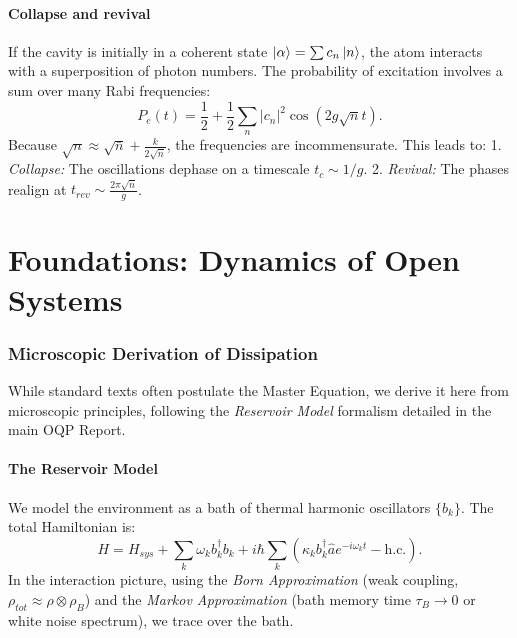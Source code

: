 \documentclass[11pt,a4paper]{article}
\newcommand{\hc}{\hat{a}}
\theoremstyle{definition}
\begin{document}
\subsection{Collapse and revival}
If the cavity is initially in a coherent state $\ket{\alpha} = \sum c_n \ket{n}$, the atom interacts with a superposition of photon numbers.
The probability of excitation involves a sum over many Rabi frequencies:
\begin{equation}
    P_e(t) = \frac{1}{2} + \frac{1}{2} \sum_n |c_n|^2 \cos(2g\sqrt{n}t).
\end{equation}
Because $\sqrt{n} \approx \sqrt{\bar{n}} + \frac{k}{2\sqrt{\bar{n}}}$, the frequencies are incommensurate. This leads to:
1.  \emph{Collapse:} The oscillations dephase on a timescale $t_c \sim 1/g$.
2.  \emph{Revival:} The phases realign at $t_{rev} \sim \frac{2\pi\sqrt{\bar{n}}}{g}$.

\part{Foundations: Dynamics of Open Systems}

\section{Microscopic Derivation of Dissipation}
\label{sec:open_systems}

While standard texts often postulate the Master Equation, we derive it here from microscopic principles, following the \emph{Reservoir Model} formalism detailed in the main OQP Report.

\subsection{The Reservoir Model}
We model the environment as a bath of thermal harmonic oscillators $\{b_k\}$. The total Hamiltonian is:
\begin{equation}
    H = H_{sys} + \sum_k \omega_k b_k^\dagger b_k + i\hbar \sum_k (\kappa_k b_k^\dagger \hc e^{-i\omega_k t} - \text{h.c.}).
\end{equation}
In the interaction picture, using the \emph{Born Approximation} (weak coupling, $\rho_{tot} \approx \rho \otimes \rho_B$) and the \emph{Markov Approximation} (bath memory time $\tau_B \to 0$ or white noise spectrum), we trace over the bath.
\end{document}
